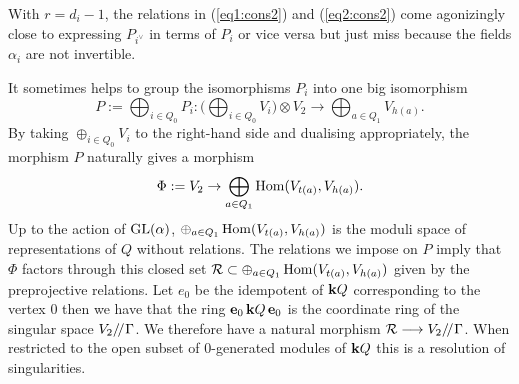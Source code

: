 \documentclass{amsart}
\theoremstyle{definition}
\begin{document}
\begin{remark}
With $r=d_i-1$, the relations in (\ref{eq1:cons2}) and (\ref{eq2:cons2}) come agonizingly close to expressing $P_{i^\vee}$ in terms of $P_{i}$ or vice versa but just miss because the fields $\alpha_i$ are not invertible.
\end{remark}

It sometimes helps to group the isomorphisms $P_i$ into one big isomorphism 
$$P := \bigoplus_{i\in Q_0} P_i \colon \bigg(\bigoplus_{i\in Q_0} V_i\bigg) \otimes V_2 \rightarrow \bigoplus_{a \in Q_1} V_{h(a)}.$$
By taking $\oplus_{i\in Q_0} V_i$ to the right-hand side and dualising appropriately, the morphism $P$ naturally gives a morphism
$$\Phi := V_2 \rightarrow \bigoplus_{a \in Q_1} \operatorname{Hom}(V_{t(a)}, V_{h(a)}).$$
Up to the action of $\operatorname{GL}(\alpha)$, $\oplus_{a \in Q_1} \operatorname{Hom}(V_{t(a)}, V_{h(a)})$ is the moduli space of representations of $Q$ without relations.
The relations we impose on $P$ imply that $\Phi$ factors through this closed set $\mathcal{R} \subset \oplus_{a \in Q_1} \operatorname{Hom}(V_{t(a)}, V_{h(a)})$ given by the preprojective relations.
Let $e_0$ be the idempotent of $\mathbf{k} Q$ corresponding to the vertex $0$ then we have that the ring $\mathbf{e}_0\, \mathbf{k} Q\, \mathbf{e}_0$ is the coordinate ring of the singular space $V_2/ \! /_{}\Gamma$.
We therefore have a natural morphism $\mathcal{R} \longrightarrow V_2 / \! /_{} \Gamma$.
When restricted to the open subset of $0$-generated modules of $\mathbf{k} Q$ this is a resolution of singularities.


\end{document}
